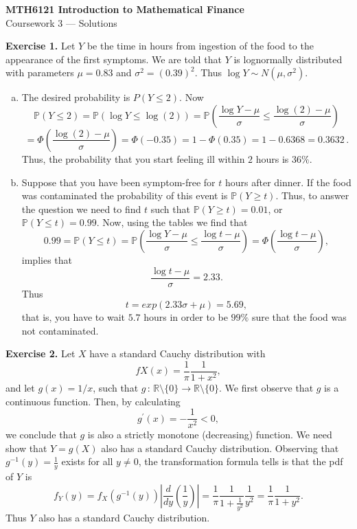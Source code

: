 \documentclass[11pt,a4paper]{report}
\begin{document}
\begin{center}
	\LARGE\textbf{MTH6121 Introduction to Mathematical Finance}\\
	Coursework 3 — Solutions
\end{center}

\textbf{Exercise 1.} Let $Y$ be the time in hours from ingestion of the food to the appearance of the first symptoms. We are told that $Y$ is lognormally distributed with parameters $\mu = 0.83$ and $\sigma^2 = (0.39)^2$. Thus $\log Y\sim N(\mu, \sigma^2)$.
\begin{enumerate}[(a)]
	\item The desired probability is $P(Y \leq 2)$. Now $$\mathbb{P}(Y\leq 2) = \mathbb{P}(\log Y\leq \log(2))=\mathbb{P}\left(\frac{\log Y-\mu}{\sigma}\leq \frac{\log(2)-\mu}{\sigma}\right)$$ $$=\Phi\left(\frac{\log(2)-\mu}{\sigma}\right)=\Phi(-0.35)=1-\Phi(0.35)=1-0.6368=0.3632\,.$$ Thus, the probability that you start feeling ill within $2$ hours is $36\%$.
	\item Suppose that you have been symptom-free for $t$ hours after dinner. If the food was contaminated the probability of this event is $\mathbb{P}(Y\geq t)$. Thus, to answer the question we need to find $t$ such that $\mathbb{P}(Y \geq t) = 0.01$, or $\mathbb{P}(Y\leq t) = 0.99$. Now, using the tables we find that $$0.99 = \mathbb{P}(Y\leq t) = \mathbb{P}\left(\frac{\log Y-\mu}{\sigma}\leq \frac{\log t-\mu}{\sigma}\right) = \Phi\left(\frac{\log t-\mu}{\sigma}\right),$$ implies that $$\frac{\log t-\mu}{\sigma} = 2.33.$$ Thus $$t = exp(2.33\sigma+\mu)=5.69,$$ that is, you have to wait $5.7$ hours in order to be $99\%$ sure that the food was not contaminated.
\end{enumerate}

\textbf{Exercise 2.} Let $X$ have a standard Cauchy distribution with $$fX(x) = \frac{1}{\pi}\frac{1}{1+x^2},$$ and let $g(x)=1/x$, such that $g\,:\,\mathbb{R}\setminus\{0\}\to\mathbb{R}\setminus\{0\}$. We first observe that $g$ is a continuous function. Then, by calculating $$g^\prime(x) = -\frac{1}{x^2}<0,$$ we conclude that $g$ is also a strictly monotone (decreasing) function. We need show that $Y = g(X)$ also has a standard Cauchy distribution. Observing that $g^{-1}(y) = \frac{1}{y}$ exists for all $y\neq0$, the transformation formula tells is that the pdf of $Y$ is $$f_Y(y)=f_X(g^{-1}(y))\left|\frac{d}{dy}\left(\frac{1}{y}\right)\right|=\frac{1}{\pi}\frac{1}{1+\frac{1}{y^2}}\frac{1}{y^2}=\frac{1}{\pi}\frac{1}{1+y^2}.$$ Thus $Y$ also has a standard Cauchy distribution.
\end{document}
